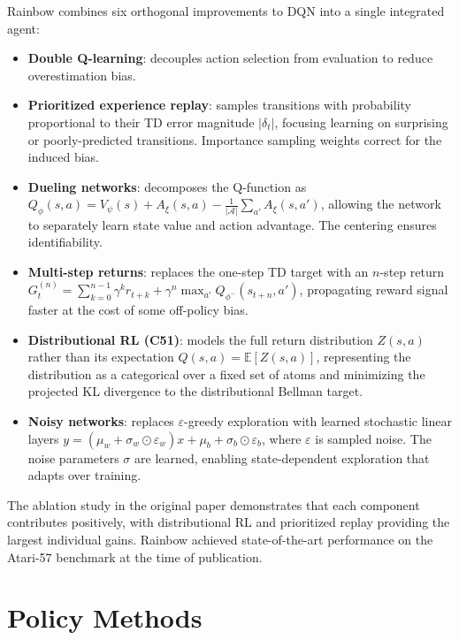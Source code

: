 \documentclass[11pt, letterpaper]{article}
\begin{document}
\begin{concept}
    Rainbow combines six orthogonal improvements to DQN into a single integrated agent:
    \begin{itemize}
        \item \textbf{Double Q-learning}: decouples action selection from evaluation to reduce overestimation bias.
        \item \textbf{Prioritized experience replay}: samples transitions with probability proportional to their TD error magnitude \(|\delta_t|\), focusing learning on surprising or poorly-predicted transitions. Importance sampling weights correct for the induced bias.
        \item \textbf{Dueling networks}: decomposes the Q-function as \(Q_\phi(s, a) = V_\psi(s) + A_\xi(s, a) - \frac{1}{|\mathcal{A}|}\sum_{a'} A_\xi(s, a')\), allowing the network to separately learn state value and action advantage. The centering ensures identifiability.
        \item \textbf{Multi-step returns}: replaces the one-step TD target with an \(n\)-step return \(G_t^{(n)} = \sum_{k=0}^{n-1} \gamma^k r_{t+k} + \gamma^n \max_{a'} Q_{\phi^-}(s_{t+n}, a')\), propagating reward signal faster at the cost of some off-policy bias.
        \item \textbf{Distributional RL (C51)}: models the full return distribution \(Z(s, a)\) rather than its expectation \(Q(s,a) = \mathbb{E}[Z(s,a)]\), representing the distribution as a categorical over a fixed set of atoms and minimizing the projected KL divergence to the distributional Bellman target.
        \item \textbf{Noisy networks}: replaces \(\varepsilon\)-greedy exploration with learned stochastic linear layers \(y = (\mu_w + \sigma_w \odot \varepsilon_w) x + \mu_b + \sigma_b \odot \varepsilon_b\), where \(\varepsilon\) is sampled noise. The noise parameters \(\sigma\) are learned, enabling state-dependent exploration that adapts over training.
    \end{itemize}
    The ablation study in the original paper demonstrates that each component contributes positively, with distributional RL and prioritized replay providing the largest individual gains. Rainbow achieved state-of-the-art performance on the Atari-57 benchmark at the time of publication.
\end{concept}

\newpage
\part{Policy Methods}
\end{document}
